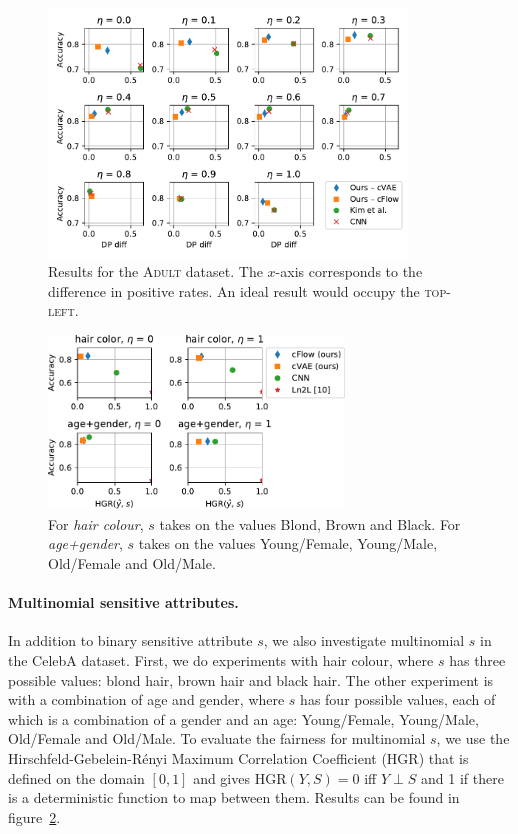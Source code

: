 \begin{figure}[htb]
  \centering
  \includegraphics[width=0.85\textwidth]{paper2/Figures/nosinn_adult_multiplot_all_landscape_diff.pdf}
  \caption{
      Results for the \textsc{Adult} dataset.
      The $x$-axis corresponds to the difference in positive rates.
      An ideal result would occupy the \textsc{top-left}.
  }%
  \label{fig:big-adult-chart}
\end{figure}
\begin{figure}[htb]
    \centering
    \includegraphics[width=0.7\textwidth]{paper2/Figures/celeba_multi_s.pdf}
    \caption{
        For \emph{hair colour}, $s$ takes on the values Blond, Brown and Black.
        For \emph{age+gender}, $s$ takes on the values Young/Female, Young/Male, Old/Female and Old/Male.
    }%
    \label{fig:multi-s}
\end{figure}

\paragraph{Multinomial sensitive attributes.}
In addition to binary sensitive attribute $s$,
we also investigate multinomial $s$ in the CelebA dataset.
First, we do experiments with hair colour, where $s$ has three possible values:
blond hair, brown hair and black hair.
The other experiment is with a combination of age and gender,
where $s$ has four possible values, each of which is a combination of a gender and an age:
Young/Female, Young/Male, Old/Female and Old/Male.
To evaluate the fairness for multinomial $s$, we use the Hirschfeld-Gebelein-R\'enyi Maximum Correlation Coefficient (HGR) \citep{mary2019fairness} that is defined on the domain $[0, 1]$ and gives $\text{HGR}(Y,S)=0$ iff $Y \perp S$
and 1 if there is a deterministic function to map between them.
Results can be found in figure~\ref{fig:multi-s}.\\

